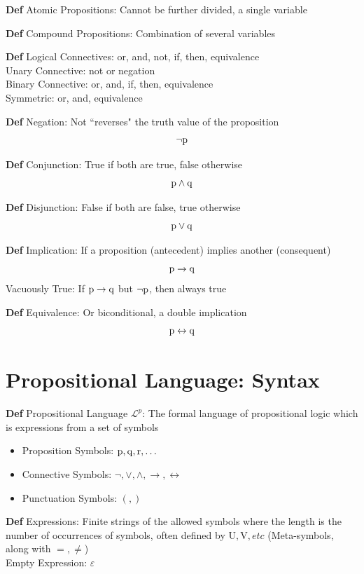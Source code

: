 \documentclass[11pt,notitlepage]{report}
\newcommand{\mc}[1]{\ensuremath{\mathcal{#1}}}
\newcommand{\tbf}[1]{\textbf{#1}}
\begin{document}
\textbf{Def} Atomic Propositions: Cannot be further divided, a single variable

\tbf{Def} Compound Propositions: Combination of several variables

\tbf{Def} Logical Connectives: or, and, not, if, then, equivalence\\
\hspace*{5mm} Unary Connective: not or negation\\
\hspace*{5mm} Binary Connective: or, and, if, then, equivalence\\
\hspace*{5mm} Symmetric: or, and, equivalence

\tbf{Def} Negation: Not ``reverses" the truth value of the proposition
$$\neg \rm p$$

\tbf{Def} Conjunction: True if both are true, false otherwise
$$\rm p \wedge \rm q$$

\tbf{Def} Disjunction: False if both are false, true otherwise
$$\rm p \vee \rm q$$

\tbf{Def} Implication: If a proposition (antecedent) implies another (consequent)
$$\rm p \to \rm q$$
\hspace*{5mm} Vacuously True: If $\rm p \to \rm q$ but $\rm \neg p$, then always true

\tbf{Def} Equivalence: Or biconditional, a double implication
$$\rm p \leftrightarrow \rm q$$

\section{Propositional Language: Syntax}

\tbf{Def} Propositional Language $\mc L^p$: The formal language of propositional logic which is expressions from a set of symbols
\begin{itemize}
    \item Proposition Symbols: $\mathrm p, \rm q, \rm r, \dots$
    \item Connective Symbols: $\neg, \vee, \wedge, \to, \leftrightarrow$
    \item Punctuation Symbols: $(, )$
\end{itemize}

\tbf{Def} Expressions: Finite strings of the allowed symbols where the length is the number of occurrences of symbols, often defined by $\mathrm U, \mathrm V, etc$ (Meta-symbols, along with $=, \ne$)\\
\hspace*{5mm} Empty Expression: $\varepsilon$
\end{document}
